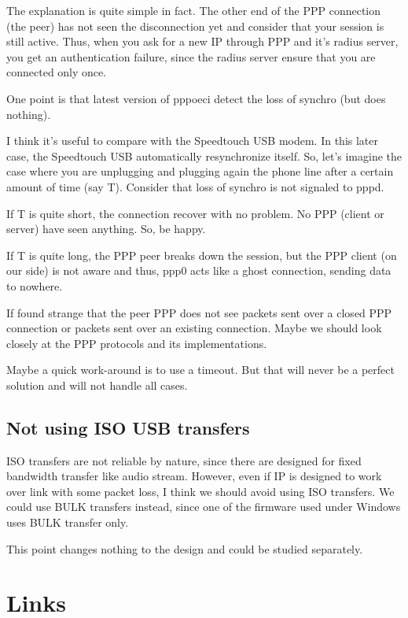 \documentclass[a4paper,12pt]{article}
\begin{document}
The explanation is quite simple in fact. The other end of the PPP
connection (the peer) has not seen the disconnection yet and consider
that your session is still active. Thus, when you ask for a new IP
through PPP and it's radius server, you get an authentication failure,
since the radius server ensure that you are connected only once.

One point is that latest version of pppoeci detect the loss of synchro
(but does nothing).

I think it's useful to compare with the Speedtouch USB modem. In this
later case, the Speedtouch USB automatically resynchronize itself. So,
let's imagine the case where you are unplugging and plugging again the
phone line after a certain amount of time (say T). Consider that loss
of synchro is not signaled to pppd.

If T is quite short, the connection recover with no problem. No PPP
(client or server) have seen anything. So, be happy.

If T is quite long, the PPP peer breaks down the session, but the PPP
client (on our side) is not aware and thus, ppp0 acts like a ghost
connection, sending data to nowhere.

If found strange that the peer PPP does not see packets sent over a
closed PPP connection or packets sent over an existing connection.
Maybe we should look closely at the PPP protocols and its
implementations.

Maybe a quick work-around is to use a timeout. But that will never be
a perfect solution and will not handle all cases.

\subsection{Not using ISO USB transfers}

ISO transfers are not reliable by nature, since there are designed for fixed
bandwidth transfer like audio stream. However, even if IP is designed
to work over link with some packet loss, I think we should avoid using
ISO transfers. We could use BULK transfers instead, since one of the
firmware used under Windows uses BULK transfer only.

This point changes nothing to the design and could be studied separately.

\section{Links}
\end{document}
